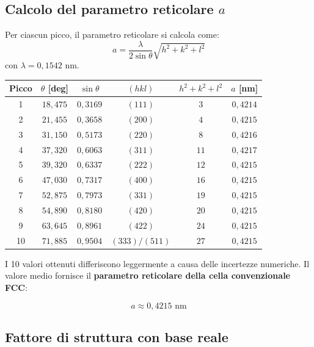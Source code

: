 \subsection{Calcolo del parametro reticolare $a$}



Per ciascun picco, il parametro reticolare si calcola come:
\begin{equation}
a = \frac{\lambda}{2\sin\theta}\sqrt{h^2 + k^2 + l^2}
\end{equation}
con $\lambda = 0{,}1542$ nm.



\begin{table}[h!]
\centering
\begin{tabular}{|c|c|c|c|c|c|}
\hline
Picco & $\theta$ [deg] & $\sin\theta$ & $(hkl)$ & $h^2+k^2+l^2$ & $a$ [nm] \\ \hline
1 & $18{,}475$ & $0{,}3169$ & $(111)$ & $3$ & $0{,}4214$ \\
2 & $21{,}455$ & $0{,}3658$ & $(200)$ & $4$ & $0{,}4215$ \\
3 & $31{,}150$ & $0{,}5173$ & $(220)$ & $8$ & $0{,}4216$ \\
4 & $37{,}320$ & $0{,}6063$ & $(311)$ & $11$ & $0{,}4217$ \\
5 & $39{,}320$ & $0{,}6337$ & $(222)$ & $12$ & $0{,}4215$ \\
6 & $47{,}030$ & $0{,}7317$ & $(400)$ & $16$ & $0{,}4215$ \\
7 & $52{,}875$ & $0{,}7973$ & $(331)$ & $19$ & $0{,}4215$ \\
8 & $54{,}890$ & $0{,}8180$ & $(420)$ & $20$ & $0{,}4215$ \\
9 & $63{,}645$ & $0{,}8961$ & $(422)$ & $24$ & $0{,}4215$ \\
10 & $71{,}885$ & $0{,}9504$ & $(333)/(511)$ & $27$ & $0{,}4215$ \\ \hline
\end{tabular}
\end{table}

I 10 valori ottenuti differiscono leggermente a causa delle incertezze numeriche. Il valore medio fornisce il \textbf{parametro reticolare della cella convenzionale FCC}:

\begin{equation}
\boxed{a \approx 0{,}4215 \text{ nm}}
\end{equation}

\subsection{Fattore di struttura con base reale}

